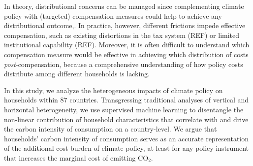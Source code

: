 \documentclass[12pt, a4paper]{article}
\begin{document}
In theory, distributional concerns can be managed since complementing climate policy with (targeted) compensation measures could help to achieve any distributional outcome,. In practice, however, different frictions impede effective compensation, such as existing distortions in the tax system (REF) or limited institutional capability (REF). %
Moreover, it is often difficult to understand which compensation measure would be effective in achieving which distribution of costs \textit{post}-compensation, because a comprehensive understanding of how policy costs distribute among different households is lacking.

In this study, we analyze the heterogeneous impacts of climate policy on households within 87 countries. Transgressing traditional analyses of vertical and horizontal heterogeneity, we use supervised machine learning to disentangle the non-linear contribution of household characteristics that correlate with and drive the carbon intensity of consumption on a country-level. We argue that households' carbon intensity of consumption serves as an accurate representation of the additional cost burden of climate policy, at least for any policy instrument that increases the marginal cost of emitting CO$_{2}$.

\end{document}
